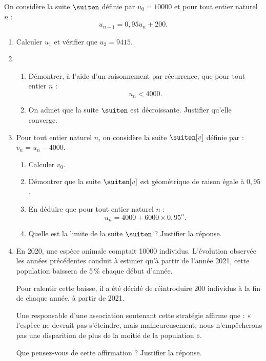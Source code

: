 On considère la suite $\suiten$ définie par $u_0 = \num{10000}$ et pour tout entier naturel $n$ : \[ u_{n+1}=0,95u_n+200. \]

\begin{enumerate}
	\item Calculer $u_1$ et vérifier que $u_2 = \num{9415}$.
	\item 
	\begin{enumerate}
		\item Démontrer, à l’aide d’un raisonnement par récurrence, que pour tout entier $n$ : \[ u_n < \num{4000}. \]
		\item On admet que la suite $\suiten$ est décroissante. Justifier qu’elle converge.
	\end{enumerate}
	\item Pour tout entier naturel $n$, on considère la suite $\suiten[v]$ définie par : $v_n=u_n-\num{4000}$.
	\begin{enumerate}
		\item Calculer $v_0$.
		\item Démontrer que la suite $\suiten[v]$ est géométrique de raison égale à $0,95$.
		\item En déduire que pour tout entier naturel $n$ : \[ u_n = \num{4000} + \num{6000} \times 0,95^n. \]
		\item Quelle est la limite de la suite $\suiten$ ? Justifier la réponse.
	\end{enumerate}
	\item En 2020, une espèce animale comptait \num{10000} individus. L’évolution observée les années précédentes conduit à estimer qu’à partir de l’année 2021, cette population baissera de 5\,\% chaque début d’année.
	
	Pour ralentir cette baisse, il a été décidé de réintroduire 200 individus à la fin de chaque année, à partir de 2021.
	
	Une responsable d’une association soutenant cette stratégie affirme que : « l’espèce ne devrait pas s’éteindre, mais malheureusement, nous n’empêcherons pas une disparition de plus de la moitié de la population ».
	
	Que pensez-vous de cette affirmation ? Justifier la réponse.
\end{enumerate}

